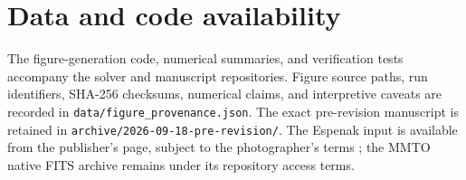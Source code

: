 \documentclass{aa}
\begin{document}
\section*{Data and code availability}
The figure-generation code, numerical summaries, and verification tests
accompany the solver and manuscript repositories. Figure source paths, run
identifiers, SHA-256 checksums, numerical claims, and interpretive caveats are
recorded in \texttt{data/figure\_provenance.json}. The exact pre-revision
manuscript is retained in
\texttt{archive/2026-09-18-pre-revision/}. The Espenak input is available from
the publisher's page, subject to the photographer's terms
\citep{Espenak2018}; the MMTO native FITS archive remains under its repository
access terms.



\end{document}
